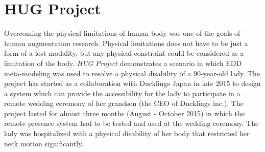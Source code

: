 
\pagebreak
\section{HUG Project}
\label{sec:eval-hug}

Overcoming the physical limitations of human body was one of the goals of human augmentation research. Physical limitations does not have to be just a form of a lost modality, but any physical constraint could be considered as a limitation of the body. \textit{HUG Project} demonstrates a scenario in which EDD meta-modeling was used to resolve a physical disability of a 90-year-old lady. The project has started as a collaboration with Ducklings Japan \cite{ducklingsjp} in late 2015 to design a system which can provide the accessibility for the lady to participate in a remote wedding ceremony of her grandson (the CEO of Ducklings inc.). The project lasted for almost three months (August - October 2015) in which the remote presence system had to be tested and used at the wedding ceremony. The lady was hospitalized with a physical disability of her body that restricted her neck motion significantly. 


